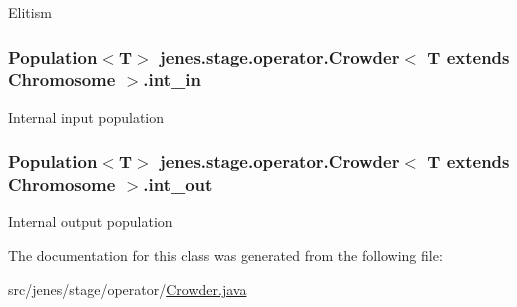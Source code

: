Elitism \hypertarget{classjenes_1_1stage_1_1operator_1_1_crowder_3_01_t_01extends_01_chromosome_01_4_a59e2223bf2006485e7c617201f0bba3e}{
\subsubsection[{int\-\_\-in}]{\setlength{\rightskip}{0pt plus 5cm}Population$<$T$>$ jenes.\-stage.\-operator.\-Crowder$<$ T extends Chromosome $>$.int\-\_\-in\hspace{0.3cm}{\ttfamily [private]}}}\label{classjenes_1_1stage_1_1operator_1_1_crowder_3_01_t_01extends_01_chromosome_01_4_a59e2223bf2006485e7c617201f0bba3e}
Internal input population \hypertarget{classjenes_1_1stage_1_1operator_1_1_crowder_3_01_t_01extends_01_chromosome_01_4_ab31ce2f75fb5516e18c73a56d31c2c57}{
\subsubsection[{int\-\_\-out}]{\setlength{\rightskip}{0pt plus 5cm}Population$<$T$>$ jenes.\-stage.\-operator.\-Crowder$<$ T extends Chromosome $>$.int\-\_\-out\hspace{0.3cm}{\ttfamily [private]}}}\label{classjenes_1_1stage_1_1operator_1_1_crowder_3_01_t_01extends_01_chromosome_01_4_ab31ce2f75fb5516e18c73a56d31c2c57}
Internal output population 

The documentation for this class was generated from the following file\-:\begin{DoxyCompactItemize}
\item 
src/jenes/stage/operator/\hyperlink{_crowder_8java}{Crowder.\-java}\end{DoxyCompactItemize}
